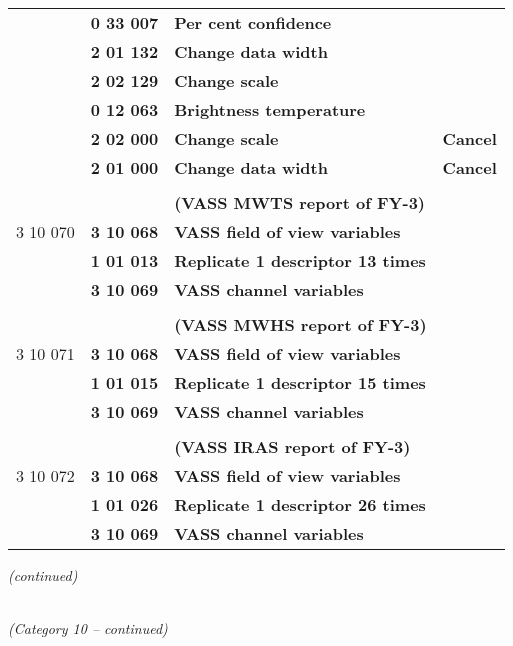 \begin{longtable}[]{@{}llll@{}}
& \textbf{0 33 007} & \textbf{Per cent confidence} &\tabularnewline
& \textbf{2 01 132} & \textbf{Change data width} &\tabularnewline
& \textbf{2 02 129} & \textbf{Change scale} &\tabularnewline
& \textbf{0 12 063} & \textbf{Brightness temperature} &\tabularnewline
& \textbf{2 02 000} & \textbf{Change scale} & \textbf{Cancel}\tabularnewline
& \textbf{2 01 000} & \textbf{Change data width} & \textbf{Cancel}\tabularnewline
& & &\tabularnewline
& & \textbf{(VASS MWTS report of FY-3)} &\tabularnewline
3 10 070 & \textbf{3 10 068} & \textbf{VASS field of view variables} &\tabularnewline
& \textbf{1 01 013} & \textbf{Replicate 1 descriptor 13 times} &\tabularnewline
& \textbf{3 10 069} & \textbf{VASS channel variables} &\tabularnewline
& & &\tabularnewline
& & \textbf{(VASS MWHS report of FY-3)} &\tabularnewline
3 10 071 & \textbf{3 10 068} & \textbf{VASS field of view variables} &\tabularnewline
& \textbf{1 01 015} & \textbf{Replicate 1 descriptor 15 times} &\tabularnewline
& \textbf{3 10 069} & \textbf{VASS channel variables} &\tabularnewline
& & &\tabularnewline
& & \textbf{(VASS IRAS report of FY-3)} &\tabularnewline
3 10 072 & \textbf{3 10 068} & \textbf{VASS field of view variables} &\tabularnewline
& \textbf{1 01 026} & \textbf{Replicate 1 descriptor 26 times} &\tabularnewline
& \textbf{3 10 069} & \textbf{VASS channel variables} &\tabularnewline
\bottomrule
\end{longtable}

\emph{(continued)}

\emph{\\
(Category 10 -- continued)}

